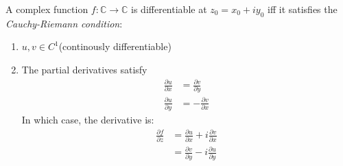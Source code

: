 \begin{theorem}A complex function $f:\mathbb{C} \to \mathbb{C}$ is differentiable at $z_0=x_0+iy_0$ iff it satisfies the \textit{Cauchy-Riemann condition}:

\begin{enumerate}
\item $u,v\in C^1$(continously differentiable)
\item The partial derivatives satisfy
\begin{equation}
\begin{aligned}
\frac{\partial u}{\partial x} &= \frac{\partial v}{\partial y} \\
\frac{\partial u}{\partial y} &= -\frac{\partial v}{\partial x}
\end{aligned}
\end{equation}
In which case, the derivative is:
\begin{equation}
\begin{aligned}
\frac{\partial f}{\partial z} &= \frac{\partial u}{\partial x} + i \frac{\partial v}{\partial x} \\
&= \frac{\partial v}{\partial y} - i \frac{\partial u}{\partial y}
\end{aligned}
\end{equation}
\end{enumerate}


\end{theorem}
